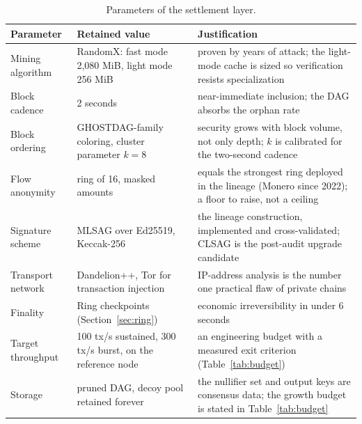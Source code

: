 \begin{table}[htbp]
\centering
\small
\caption{Parameters of the settlement layer.}
\label{tab:settlement}
\begin{tabularx}{\textwidth}{@{}L{4.0cm}L{4.6cm}Y@{}}
\toprule
Parameter & Retained value & Justification \\
\midrule
Mining algorithm & RandomX: fast mode 2,080 MiB, light mode 256 MiB & proven by years of attack; the light-mode cache is sized so verification resists specialization \\
Block cadence & 2 seconds & near-immediate inclusion; the DAG absorbs the orphan rate \\
Block ordering & GHOSTDAG-family coloring, cluster parameter $k = 8$ & security grows with block volume, not only depth; $k$ is calibrated for the two-second cadence \\
Flow anonymity & ring of 16, masked amounts & equals the strongest ring deployed in the lineage (Monero since 2022); a floor to raise, not a ceiling \\
Signature scheme & MLSAG over Ed25519, Keccak-256 & the lineage construction, implemented and cross-validated; CLSAG is the post-audit upgrade candidate \\
Transport network & Dandelion++, Tor for transaction injection & IP-address analysis is the number one practical flaw of private chains \\
Finality & Ring checkpoints (Section~\ref{sec:ring}) & economic irreversibility in under 6 seconds \\
Target throughput & 100 tx/s sustained, 300 tx/s burst, on the reference node & an engineering budget with a measured exit criterion (Table~\ref{tab:budget}) \\
Storage & pruned DAG, decoy pool retained forever & the nullifier set and output keys are consensus data; the growth budget is stated in Table~\ref{tab:budget} \\
\bottomrule
\end{tabularx}
\end{table}

